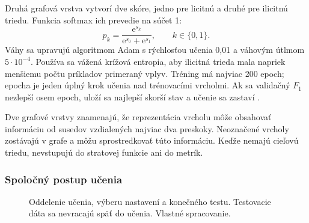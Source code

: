 Druhá grafová vrstva vytvorí dve skóre, jedno pre licitnú a druhé pre
ilicitnú triedu. Funkcia softmax ich prevedie na súčet 1:
\begin{equation}
  p_k=\frac{\mathrm{e}^{s_k}}
  {\mathrm{e}^{s_0}+\mathrm{e}^{s_1}},\qquad k\in\{0,1\}.
  \label{eq:softmax}
\end{equation}
Váhy sa
upravujú algoritmom Adam s rýchlosťou učenia 0,01 a váhovým útlmom
$5\cdot10^{-4}$. Používa sa vážená krížová entropia, aby ilicitná
trieda mala napriek menšiemu počtu príkladov primeraný vplyv. Tréning
má najviac 200 epoch; epocha je jeden úplný krok učenia nad
trénovacími vrcholmi. Ak sa validačný $F_1$ nezlepší osem epoch, uloží
sa najlepší skorší stav a učenie sa zastaví \cite{kipf2017gcn}.

Dve grafové vrstvy znamenajú, že reprezentácia vrcholu môže obsahovať
informáciu od susedov vzdialených najviac dva preskoky. Neoznačené
vrcholy zostávajú v grafe a môžu sprostredkovať túto informáciu. Keďže
nemajú cieľovú triedu, nevstupujú do stratovej funkcie ani do metrík.

\subsubsection{Spoločný postup učenia}

\begin{figure}[htbp]
  \centering
  \caption{Oddelenie učenia, výberu nastavení a konečného testu.
  Testovacie dáta sa nevracajú späť do učenia. Vlastné spracovanie.}
  \label{fig:model-training-flow}
\end{figure}

